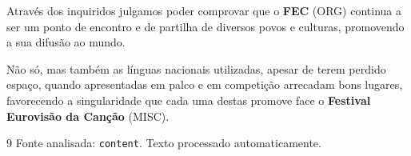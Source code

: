 \documentclass[12pt,a4paper]{article}
\begin{document}
Através dos inquiridos julgamos poder comprovar que o \textbf{FEC} (ORG) continua a ser um ponto de encontro e de partilha de diversos povos e culturas, promovendo a sua difusão ao mundo.

Não  só,  mas  também  as  línguas  nacionais  utilizadas,  apesar  de  terem  perdido  espaço, quando apresentadas em palco e em competição arrecadam bons lugares, favorecendo a singularidade que cada uma destas promove face o \textbf{Festival Eurovisão da Canção} (MISC).



\vspace{1cm}
\begin{thebibliography}{9}
    Fonte analisada: \texttt{content}. Texto processado automaticamente.
\end{thebibliography}
\end{document}
